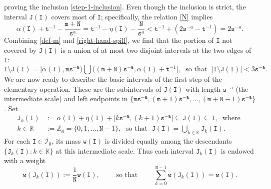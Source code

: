 \documentclass[12pt, twoside]{article}
\theoremstyle{definition}
\numberwithin{equation}{section}
\begin{document}
proving the inclusion \eqref{step-1-inclusion}. Even though the inclusion is strict, the interval $\mathtt J(\mathtt I)$ covers most of $\mathtt I$; specifically, the relation \eqref{N} implies 
\begin{equation}  \label{right-hand-spill} 
\alpha(\mathtt I) + \mathtt t^{-1} - \frac{\mathtt m + \mathtt N}{\mathtt s^{\mathtt a}} = \mathtt t^{-1} - \eta(\mathtt I) - \frac{\mathtt N}{\mathtt s^{\mathtt a}} < \mathtt t^{-1} + (2\mathtt s^{-\mathtt a} - \mathtt t^{-1}) = 2 \mathtt s^{-\mathtt a}. \end{equation} 
Combining \eqref{def-m} and \eqref{right-hand-spill}, we find that the portion of $\mathtt I$ not covered by $\mathtt J(\mathtt I)$ is a union of at most two disjoint intervals at the two edges of $\mathtt I$:
\begin{equation}  \label{spill}
\mathtt I \setminus \mathtt J(\mathtt I)  = \bigl[\alpha(\mathtt I),  {\mathtt m}{\mathtt s^{-\mathtt a}} \bigr) \bigcup \bigl((\mathtt m + \mathtt N){\mathtt s^{- \mathtt a}}, \alpha(\mathtt I) + \mathtt t^{-1} \bigr], \; \text{ so that } \; 
\bigl|\mathtt I \setminus \mathtt J(\mathtt I) \bigr| < 3 \mathtt s^{-\mathtt a}. 
\end{equation} 
\vskip0.1in 
\noindent We are now ready to describe the basic intervals of the first step of the elementary operation. These are the subintervals of $\mathtt J(\mathtt I)$ with length $\mathtt s^{-\mathtt a}$ (the intermediate scale) and left endpoints in $\{\mathtt m \mathtt s^{-\mathtt a}, (\mathtt m+1) \mathtt s^{-\mathtt a}, \ldots, (\mathtt m + \mathtt N-1) \mathtt s^{-\mathtt a} \}$. Set 
\begin{align} \mathtt J_k(\mathtt I) &:= \alpha(\mathtt I) + \eta(\mathtt I) + \bigl[ k \mathtt s^{-\mathtt a}, (k+1) \mathtt s^{-\mathtt a} \bigr] \subseteq \mathtt J(\mathtt I) \subseteq \mathtt I, \; \text{ where } \label{JkI} \\  k \in \mathbb K &:= \mathbb Z_{\mathtt N} = \{0, 1, \ldots, \mathtt N-1\}, \; \text{ so that } \; \mathtt J(\mathtt I) = \bigcup_{k \in \mathbb K} \mathtt J_k(\mathtt I).   \label{def-K}
\end{align}  
For each $\mathtt I \in \mathscr{I}_0$, its mass $\mathtt w(\mathtt I)$ is divided equally among the descendants $\{\mathtt J_k(\mathtt I) : k \in \mathbb K \}$ at this intermediate scale. Thus each interval $\mathtt J_k(\mathtt I)$ is endowed with a weight
\begin{equation} \label{mass-wk} \mathtt w(\mathtt J_k(\mathtt I)) := \frac{1}{\mathtt N} \mathtt w(\mathtt I), \qquad \text{ so that } \qquad \sum_{k=0}^{\mathtt N-1} \mathtt w(\mathtt J_k(\mathtt I)) = \mathtt w(\mathtt I). \end{equation}  
\end{document}
